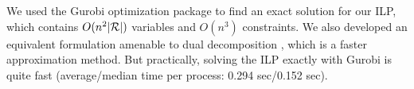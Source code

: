 We used the Gurobi optimization package to find an exact solution for our ILP, which contains $O(n^2|\mathcal{R}|)$ variables and $O(n^3)$ constraints. We also developed an equivalent formulation amenable to dual decomposition \cite{dualdecomp}, which is a faster approximation method. But practically, solving the ILP exactly with Gurobi is quite fast (average/median time per process: 0.294 sec/0.152 sec).



